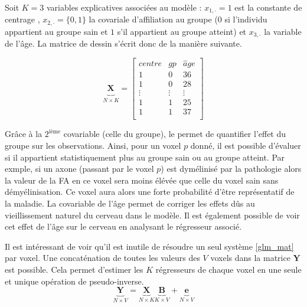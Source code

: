 Soit $K=3$ variables explicatives associées au modèle :
$x_{1,\cdot}=1$ est la constante de \og centrage \fg, 
$x_{2,\cdot}= \{0,1\}$ la covariale d'affiliation au groupe ($0$ si l'individu appartient au groupe sain et $1$ s'il appartient au groupe atteint)
et $x_{3,\cdot}$ la variable de l'âge.
La matrice de dessin s'écrit donc de la manière suivante.

$$\underbrace{\mathbf{X}_{}}_{N\times K} = \left[\begin{array}{ccc} 
                                             centre & gp & \hat{a}ge\\
                                             1 & 0 & 36\\
                                             1 & 0 & 28\\
                                             \vdots & \vdots & \vdots\\
                                             1 & 1 & 25\\
                                             1 & 1 & 37\\
					      \end{array}\right] $$

Grâce à la $2^{\text{ième}}$ covariable (celle du groupe), le \mlg permet de quantifier l'effet du groupe sur les observations. 
Ainsi, pour un voxel $p$ donné, il est possible d'évaluer si il appartient statistiquement plus au groupe sain ou au groupe atteint.
Par exmple, si un axone (passant par le voxel $p$) est dymélinisé par la pathologie
alors la valeur de la FA en ce voxel sera moins élévée que celle du voxel sain sans démyélinisation.
Ce voxel aura alors une forte probabilité d'être représentatif de la maladie.
La covariable de l'âge permet de corriger les effets dûs au vieillissement naturel du cerveau dans le modèle.
Il est également possible de voir cet effet de l'âge sur le cerveau en analysant le régresseur associé.

Il est intéressant de voir qu'il est inutile de résoudre un seul système \eqref{glm_mat} par voxel.
Une concaténation de toutes les valeurs des $V$ voxels dans la matrice $\mathbf{Y}$ est possible.
Cela permet d'estimer les $K$ régresseurs de chaque voxel en une seule et unique opération de pseudo-inverse.
\begin{equation}
    \underbrace{\mathbf{Y}}_{N\times V} = 
	      \underbrace{\mathbf{X}}_{N\times K}\underbrace{\mathbf{B}}_{K\times V} + \underbrace{\mathbf{e}}_{N\times V}
    \label{ex_glm_mat}
\end{equation}



